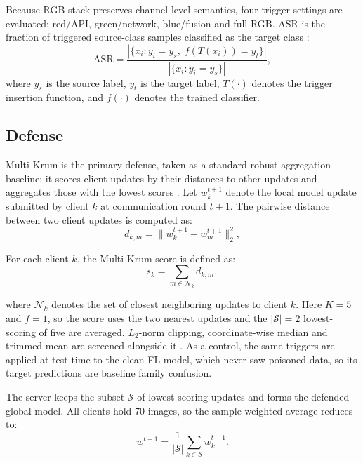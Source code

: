 \documentclass[conference]{IEEEtran}
\begin{document}
Because RGB-stack preserves channel-level semantics, four trigger settings are evaluated: red/API, green/network, blue/fusion and full RGB. ASR is the fraction of triggered source-class samples classified as the target class \cite{liu2024persistent}:
\begin{equation}
	\mathrm{ASR} =
	\frac{
		|\{x_i : y_i = y_s,\; f(T(x_i)) = y_t\}|
	}{
		|\{x_i : y_i = y_s\}|
	},
\end{equation}
where $y_s$ is the source label, $y_t$ is the target label, $T(\cdot)$ denotes the trigger insertion function, and $f(\cdot)$ denotes the trained classifier.

\subsection{Defense}

Multi-Krum is the primary defense, taken as a standard robust-aggregation baseline: it scores client updates by their distances to other updates and aggregates those with the lowest scores \cite{blanchard2017krum}. Let $w_k^{t+1}$ denote the local model update submitted by client $k$ at communication round $t+1$. The pairwise distance between two client updates is computed as:
\begin{equation}
	d_{k,m} = \| w_k^{t+1} - w_m^{t+1} \|_2^2,
\end{equation}

For each client $k$, the Multi-Krum score is defined as:
\begin{equation}
	s_k =
	\sum_{m \in \mathcal{N}_k}
	d_{k,m},
\end{equation}

where $\mathcal{N}_k$ denotes the set of closest neighboring updates to client $k$. 
Here $K=5$ and $f=1$, so the score uses the two nearest updates and the $|\mathcal{S}|=2$ lowest-scoring of five are averaged. $L_2$-norm clipping, coordinate-wise median and trimmed mean are screened alongside it \cite{yin2018byzantine}. As a control, the same triggers are applied at test time to the clean FL model, which never saw poisoned data, so its target predictions are baseline family confusion.

The server keeps the subset $\mathcal{S}$ of lowest-scoring updates and forms the defended global model. All clients hold 70 images, so the sample-weighted average reduces to:
\begin{equation}
	w^{t+1} =
	\frac{1}{|\mathcal{S}|}
	\sum_{k \in \mathcal{S}}
	w_k^{t+1}.
\end{equation}
\end{document}
